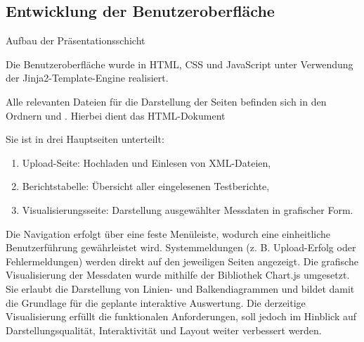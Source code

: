 \subsection{Entwicklung der Benutzeroberfläche}
\label{subsec:entwicklung-der-benutzeroberflache}
Aufbau der Präsentationsschicht


Die Benutzeroberfläche wurde in HTML, CSS und JavaScript unter Verwendung der Jinja2-Template-Engine realisiert.

Alle relevanten Dateien für die Darstellung der Seiten befinden sich in den Ordnern  und .
Hierbei dient das HTML-Dokument 




Sie ist in drei Hauptseiten unterteilt:

\begin{enumerate}

\item
Upload-Seite: Hochladen und Einlesen von XML-Dateien,

\item
Berichtstabelle: Übersicht aller eingelesenen Testberichte,

\item
Visualisierungsseite: Darstellung ausgewählter Messdaten in grafischer Form.

\end{enumerate}

Die Navigation erfolgt über eine feste Menüleiste, wodurch eine einheitliche Benutzerführung gewährleistet wird.
Systemmeldungen (z. B. Upload-Erfolg oder Fehlermeldungen) werden direkt auf den jeweiligen Seiten angezeigt.
Die grafische Visualisierung der Messdaten wurde mithilfe der Bibliothek Chart.js umgesetzt.
Sie erlaubt die Darstellung von Linien- und Balkendiagrammen und bildet damit die Grundlage für die geplante interaktive Auswertung.
Die derzeitige Visualisierung erfüllt die funktionalen Anforderungen, soll jedoch im Hinblick auf Darstellungsqualität,
Interaktivität und Layout weiter verbessert werden.


